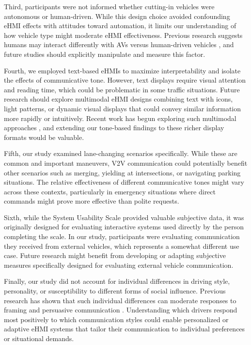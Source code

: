 \documentclass[manuscript,review]{acmart}
\begin{document}
Third, participants were not informed whether cutting-in vehicles were autonomous or human-driven. While this design choice avoided confounding eHMI effects with attitudes toward automation, it limits our understanding of how vehicle type might moderate eHMI effectiveness. Previous research suggests humans may interact differently with AVs versus human-driven vehicles \cite{huang2022sharing, stanton2020turing}, and future studies should explicitly manipulate and measure this factor.

Fourth, we employed text-based eHMIs to maximize interpretability and isolate the effects of communicative tone. However, text displays require visual attention and reading time, which could be problematic in some traffic situations. Future research should explore multimodal eHMI designs combining text with icons, light patterns, or dynamic visual displays that could convey similar information more rapidly or intuitively. Recent work has begun exploring such multimodal approaches \cite{liu2025where}, and extending our tone-based findings to these richer display formats would be valuable.

Fifth, our study examined lane-changing scenarios specifically. While these are common and important maneuvers, V2V communication could potentially benefit other scenarios such as merging, yielding at intersections, or navigating parking situations. The relative effectiveness of different communicative tones might vary across these contexts, particularly in emergency situations where direct commands might prove more effective than polite requests.

Sixth, while the System Usability Scale provided valuable subjective data, it was originally designed for evaluating interactive systems used directly by the person completing the scale. In our study, participants were evaluating communication they received from external vehicles, which represents a somewhat different use case. Future research might benefit from developing or adapting subjective measures specifically designed for evaluating external vehicle communication.

Finally, our study did not account for individual differences in driving style, personality, or susceptibility to different forms of social influence. Previous research has shown that such individual differences can moderate responses to framing and persuasive communication \cite{anderson2010framing}. Understanding which drivers respond most positively to which communication styles could enable personalized or adaptive eHMI systems that tailor their communication to individual preferences or situational demands.
\end{document}
